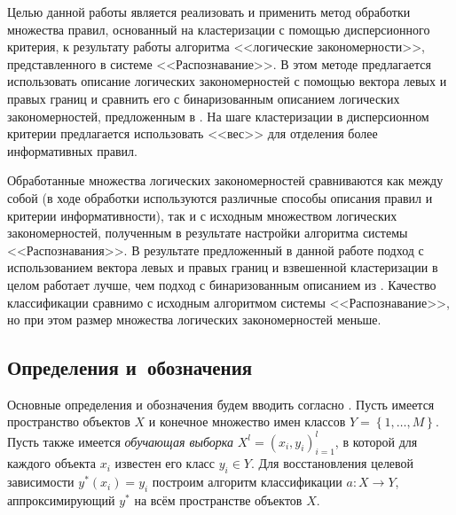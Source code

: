 \documentclass[12pt]{article}
\begin{document}
Целью данной работы является реализовать и применить метод обработки
множества правил, основанный на кластеризации с помощью дисперсионного
критерия, к результату работы алгоритма <<логические закономерности>>,
представленного в системе <<Распознавание>>. В этом методе
предлагается использовать описание логических закономерностей с
помощью вектора левых и правых границ и сравнить его с бинаризованным
описанием логических закономерностей, предложенным в
\cite{novikov15}. На шаге кластеризации в дисперсионном критерии
предлагается использовать <<вес>> для отделения более информативных
правил.

Обработанные множества логических закономерностей сравниваются как
между собой (в ходе обработки используются различные способы описания
правил и критерии информативности), так и с исходным множеством
логических закономерностей, полученным в результате настройки
алгоритма системы <<Распознавания>>. В результате предложенный в
данной работе подход с использованием вектора левых и правых границ и
взвешенной кластеризации в целом работает лучше, чем подход с
бинаризованным описанием из \cite{novikov15}. Качество
классификации сравнимо с исходным алгоритмом системы
<<Распознавание>>, но при этом размер множества логических
закономерностей меньше.

\subsection{Определения и~обозначения}
\label{subsec:defs}



Основные определения и обозначения будем вводить согласно
\cite{voron10logicalgs}. Пусть имеется пространство объектов \(X\) и
конечное множество имен классов \(Y = \left\{1, \dots,
M\right\}\). Пусть также имеется \emph{обучающая выборка} \(X^{l} =
(x_i, y_i)_{i = 1}^{l}\), в которой для каждого объекта \(x_i\)
известен его класс \(y_i \in Y\).  Для восстановления целевой
зависимости \(y^{*}(x_i) = y_i\) построим алгоритм классификации
\(a\colon X \rightarrow Y\), аппроксимирующий \(y^{*}\) на всём
пространстве объектов \(X\).
\end{document}
